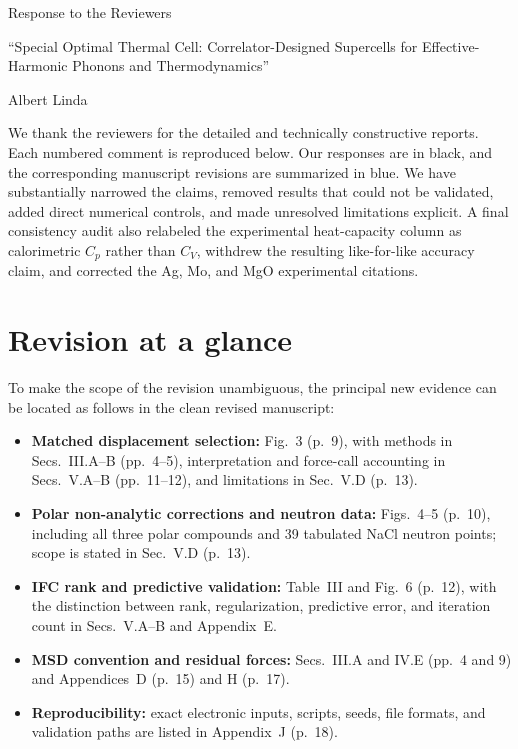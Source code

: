 \documentclass[11pt]{article}
\begin{document}
\begin{center}
{\Large Response to the Reviewers}\par
\vspace{0.4em}
{\large ``Special Optimal Thermal Cell: Correlator-Designed Supercells for Effective-Harmonic Phonons and Thermodynamics''}\par
\vspace{0.3em}
Albert Linda
\end{center}

We thank the reviewers for the detailed and technically constructive reports.
Each numbered comment is reproduced below. Our responses are in black,
and the corresponding manuscript revisions are summarized in blue. We have
substantially narrowed the claims, removed results that could not be validated,
added direct numerical controls, and made unresolved limitations explicit. A
final consistency audit also relabeled the experimental heat-capacity column as
calorimetric $C_p$ rather than $C_V$, withdrew the resulting like-for-like
accuracy claim, and corrected the Ag, Mo, and MgO experimental citations.

\section*{Revision at a glance}

To make the scope of the revision unambiguous, the principal new evidence can
be located as follows in the clean revised manuscript:
\begin{itemize}[leftmargin=1.5em]
\item \textbf{Matched displacement selection:} Fig.~3 (p.~9), with methods in
Secs.~III.A--B (pp.~4--5), interpretation and force-call accounting in
Secs.~V.A--B (pp.~11--12), and limitations in Sec.~V.D (p.~13).
\item \textbf{Polar non-analytic corrections and neutron data:} Figs.~4--5
(p.~10), including all three polar compounds and 39 tabulated NaCl neutron
points; scope is stated in Sec.~V.D (p.~13).
\item \textbf{IFC rank and predictive validation:} Table~III and Fig.~6
(p.~12), with the distinction between rank, regularization, predictive error,
and iteration count in Secs.~V.A--B and Appendix~E.
\item \textbf{MSD convention and residual forces:} Secs.~III.A and IV.E
(pp.~4 and 9) and Appendices~D (p.~15) and H (p.~17).
\item \textbf{Reproducibility:} exact electronic inputs, scripts, seeds, file
formats, and validation paths are listed in Appendix~J (p.~18).
\end{itemize}
\end{document}
